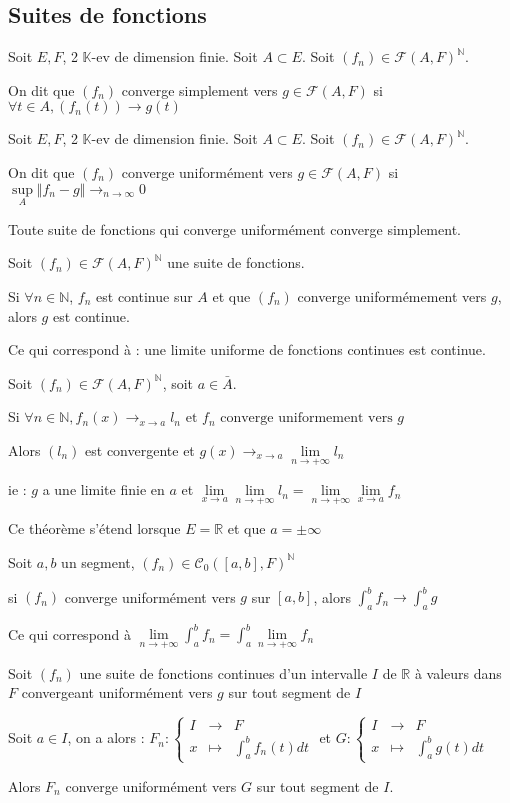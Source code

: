 \documentclass[a4paper,12pt]{book}
\newcommand{\Def}[2]{\begin{tcolorbox}[colback=white,colframe=red!10!green!20!blue!75!, title=Définition : #1]#2\end{tcolorbox}}
\newcommand{\Thr}[2]{\begin{tcolorbox}[sharp corners, colback=white,colframe=red!10!blue!30!green!75!, title=Théorème : #1]#2\end{tcolorbox}}
\def\R{\mathbb{R}}
\def\N{\mathbb{N}}
\def\K{\mathbb{K}}
\begin{document}
\subsection{Suites de fonctions}
\Def{Convergence simple}{Soit $E,F$, 2 $\K$-ev de dimension finie. Soit $A\subset E$. Soit $(f_n)\in\mathcal{F}(A,F)^\N$.
\par On dit que $(f_n)$ converge simplement vers $g\in\mathcal{F}(A,F)$ si $\forall t\in A, (f_n(t))\to g(t)$}
\Def{Convergence uniforme}{Soit $E,F$, 2 $\K$-ev de dimension finie. Soit $A\subset E$. Soit $(f_n)\in\mathcal{F}(A,F)^\N$.
\par On dit que $(f_n)$ converge uniformément vers $g\in\mathcal{F}(A,F)$ si $\sup\limits_{A}\Vert f_n-g\Vert \to_{n\to\infty} 0$}
\Thr{}{Toute suite de fonctions qui converge uniformément converge simplement.}
\Thr{Continuité uniforme}{Soit $(f_n)\in\mathcal{F}(A,F)^\N$ une suite de fonctions.
\par Si $\forall n\in\N$, $f_n$ est continue sur $A$ et que $(f_n)$ converge uniformémement vers $g$, alors $g$ est continue.
\par Ce qui correspond à : une limite uniforme de fonctions continues est continue.}
\Thr{Extension de limite uniforme}{Soit $(f_n)\in\mathcal{F}(A,F)^\N$, soit $a\in\bar{A}$.
\par Si $\forall n\in\N, f_n(x)\to_{x\to a}l_n\text{ et }f_n\text{ converge uniformement vers }g$
\par Alors $(l_n)$ est convergente et $g(x)\to_{x\to a}\lim\limits_{n\to+\infty}l_n$
\par ie : $g$ a une limite finie en $a$ et $\lim\limits_{x\to a} \lim\limits_{n\to+\infty}l_n = \lim\limits_{n\to+\infty}\lim\limits_{x\to a} f_n$
\par Ce théorème s'étend lorsque $E=\R$ et que $a=\pm\infty$}
\Thr{Intégration uniforme ou théorème d'échange limite-intégrale uniforme}{Soit ${a,b}$ un segment, $(f_n)\in\mathcal{C}_0([a,b],F)^\N$
\par si $(f_n)$ converge uniformément vers $g$ sur $[a,b]$, alors $\int_a^bf_n\to \int_a^bg$
\par Ce qui correspond à $\lim\limits_{n\to+\infty}\int_a^bf_n = \int_a^b\lim\limits_{n\to+\infty}f_n$}
\Thr{}{Soit $(f_n)$ une suite de fonctions continues d'un intervalle $I$ de $\R$ à valeurs dans $F$ convergeant uniformément vers $g$ sur tout segment de $I$
\par Soit $a\in I$, on a alors : $F_n:\left\{\begin{array}{rcl}I & \to & F \\ x & \mapsto & \int_a^bf_n(t)dt\end{array}\right.$ et $G:\left\{\begin{array}{rcl}I & \to & F \\ x & \mapsto & \int_a^bg(t)dt\end{array}\right.$
\par Alors $F_n$ converge uniformément vers $G$ sur tout segment de $I$.}
\end{document}
